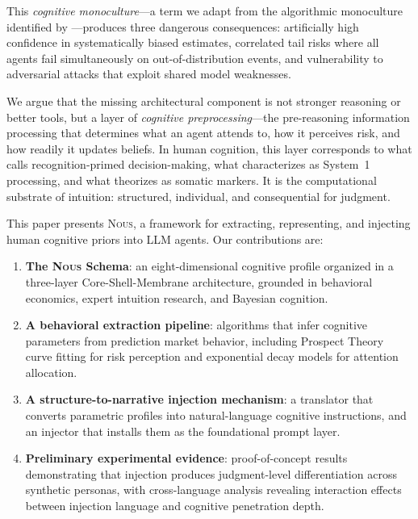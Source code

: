 \documentclass[11pt]{article}
\newcommand{\nous}{\textsc{Nous}}
\begin{document}
This \emph{cognitive monoculture}---a term we adapt from the algorithmic monoculture identified by \citet{kleinberg2021algorithmic}---produces three dangerous consequences: artificially high confidence in systematically biased estimates, correlated tail risks where all agents fail simultaneously on out-of-distribution events, and vulnerability to adversarial attacks that exploit shared model weaknesses.

We argue that the missing architectural component is not stronger reasoning or better tools, but a layer of \emph{cognitive preprocessing}---the pre-reasoning information processing that determines what an agent attends to, how it perceives risk, and how readily it updates beliefs. In human cognition, this layer corresponds to what \citet{klein1998sources} calls recognition-primed decision-making, what \citet{kahneman2011thinking} characterizes as System~1 processing, and what \citet{damasio1994descartes} theorizes as somatic markers. It is the computational substrate of intuition: structured, individual, and consequential for judgment.

This paper presents \nous{}, a framework for extracting, representing, and injecting human cognitive priors into LLM agents. Our contributions are:

\begin{enumerate}[leftmargin=*,itemsep=2pt]
    \item \textbf{The \nous{} Schema}: an eight-dimensional cognitive profile organized in a three-layer Core-Shell-Membrane architecture, grounded in behavioral economics, expert intuition research, and Bayesian cognition.
    \item \textbf{A behavioral extraction pipeline}: algorithms that infer cognitive parameters from prediction market behavior, including Prospect Theory curve fitting for risk perception and exponential decay models for attention allocation.
    \item \textbf{A structure-to-narrative injection mechanism}: a translator that converts parametric profiles into natural-language cognitive instructions, and an injector that installs them as the foundational prompt layer.
    \item \textbf{Preliminary experimental evidence}: proof-of-concept results demonstrating that injection produces judgment-level differentiation across synthetic personas, with cross-language analysis revealing interaction effects between injection language and cognitive penetration depth.
\end{enumerate}
\end{document}
